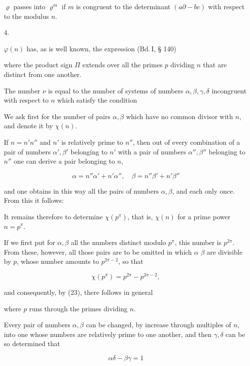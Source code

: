 $\varrho$ passes into $\varrho^m$ if $m$ is congruent to the determinant $(a\partial - bc)$ with respect to the modulus $n$.

4. 

$\varphi(n)$ has, as is well known, the expression (Bd.\,I, § 140)


where the product sign $\varPi$ extends over all the primes $p$ dividing $n$ that are distinct from one another.

The number $\nu$ is equal to the number of systems of numbers $\alpha, \beta, \gamma, \delta$ incongruent with respect to $n$ which satisfy the condition


We ask first for the number of pairs $\alpha, \beta$ which have no common divisor with $n$, and denote it by $\chi(n)$.

If $n = n'n''$ and $n'$ is relatively prime to $n''$, then out of every combination of a pair of numbers $\alpha', \beta'$ belonging to $n'$ with a pair of numbers $\alpha'', \beta''$ belonging to $n''$ one can derive a pair belonging to $n$,

\[
\alpha = n''\alpha' + n'\alpha'', \quad \beta = n''\beta' + n'\beta''
\]

and one obtains in this way all the pairs of numbers $\alpha, \beta$, and each only once. From this it follows:


It remains therefore to determine $\chi(p^\pi)$, that is, $\chi(n)$ for a prime power $n = p^\pi$.

If we first put for $\alpha, \beta$ all the numbers distinct modulo $p^\pi$, this number is $p^{2\pi}$. From these, however, all those pairs are to be omitted in which $\alpha$  $\beta$ are divisible by $p$, whose number amounts to $p^{2\pi-2}$, so that

\[
\chi(p^\pi) = p^{2\pi} - p^{2\pi-2},
\]

and consequently, by (23), there follows in general


where $p$ runs through the primes dividing $n$.

Every pair of numbers $\alpha, \beta$ can be changed, by increase through multiples of $n$, into one whose numbers are relatively prime to one another, and then $\gamma, \delta$ can be so determined that

\[
\alpha\delta - \beta\gamma = 1
\]
